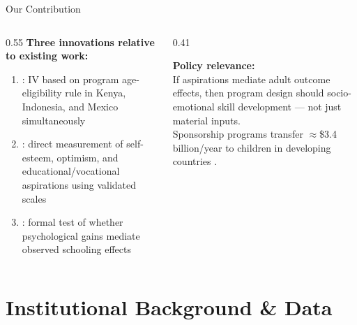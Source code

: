 \documentclass[aspectratio=169, 10pt]{beamer}
\begin{document}
\begin{frame}{Our Contribution}
  \begin{columns}
    \begin{column}{0.55\textwidth}
      \textbf{Three innovations relative to existing work:}
      \vspace{0.4em}
      \begin{enumerate}
        \item {}: IV based on program age-eligibility rule in Kenya, Indonesia, and Mexico simultaneously
        \vspace{0.3em}
        \item {}: direct measurement of self-esteem, optimism, and educational/vocational aspirations using validated scales
        \vspace{0.3em}
        \item {}: formal test of whether psychological gains mediate observed schooling effects
      \end{enumerate}
    \end{column}
    \begin{column}{0.41\textwidth}
      \begin{resultbox}
        \textbf{Policy relevance:}\\[0.4em]
        If aspirations mediate adult outcome effects, then program design should  socio-emotional skill development --- not just material inputs.\\[0.5em]
        Sponsorship programs transfer $\approx$\$3.4 billion/year to children in developing countries \citep{Wydick2013}.
      \end{resultbox}
    \end{column}
  \end{columns}
\end{frame}

\section{Institutional Background \& Data}
\end{document}
